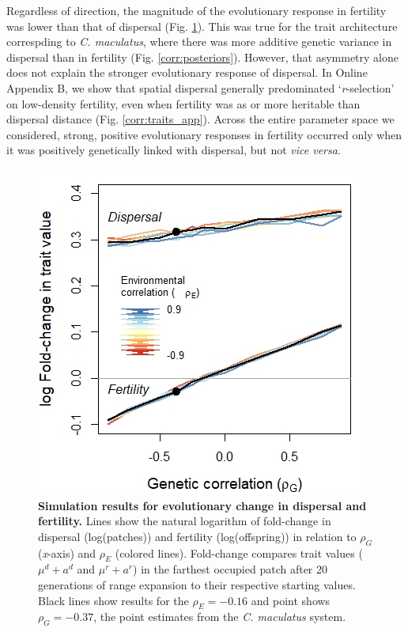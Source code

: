 \documentclass[11pt]{article}
\newcommand{\tom}[1]{{\textit{\color{WildStrawberry}{[#1]}}}}
\newcommand{\revise}[1]{{\color{Mahogany}{#1}}}
\begin{document}
Regardless of direction, the magnitude of the evolutionary response in fertility was lower than that of dispersal (Fig. \ref{corr:traits}).
This was true for the trait architecture correspding to \textit{C. maculatus}, where there was more additive genetic variance in dispersal than in fertility (Fig. \ref{corr:posteriors}).
However, that asymmetry alone does not explain the stronger evolutionary response of dispersal.
In Online Appendix B, we show that spatial \revise{sorting of} dispersal generally predominated `\textit{r}-selection’ on low-density fertility, even when fertility was as or more heritable than dispersal distance (Fig. \ref{corr:traits_app}).
Across the entire parameter space we considered, strong, positive evolutionary responses in fertility occurred only when it was positively genetically linked with dispersal, but not \textit{vice versa}.

\begin{figure}[h!]
\centering
\includegraphics[width=0.5\linewidth]{Figures/trait_change}
\caption{\textbf{Simulation results for evolutionary change in dispersal and fertility.} Lines show the natural logarithm of fold-change in dispersal (log(patches)) and fertility (log(offspring)) in relation to $\rho_{G}$ (\textit{x}-axis) and $\rho_{E}$ (colored lines).
Fold-change compares trait values ($\mu^{d} + a^{d}$ and $\mu^{r} + a^{r}$) in the farthest occupied patch after 20 generations of range expansion to their respective starting values.
Black lines show results for the $\rho_{E} = -0.16$ and point shows $\rho_{G} = -0.37$, the point estimates from the \textit{C. maculatus} system.}
\label{corr:traits}
\end{figure}
\end{document}

